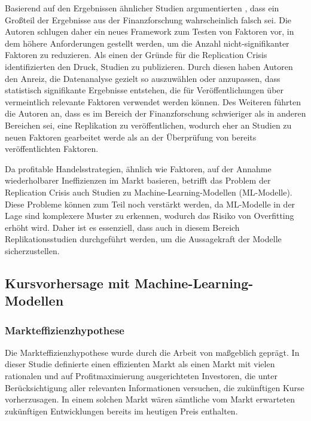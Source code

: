 \documentclass[a4paper, 12pt]{article}
\begin{document}
Basierend auf den Ergebnissen ähnlicher Studien argumentierten \textcite{Harvey2016}, dass ein Großteil der Ergebnisse aus der Finanzforschung wahrscheinlich falsch sei.
Die Autoren schlugen daher ein neues Framework zum Testen von Faktoren vor, in dem höhere Anforderungen gestellt werden, um die Anzahl nicht-signifikanter Faktoren zu reduzieren.
Als einen der Gründe für die Replication Crisis identifizierten \textcite{Harvey2016} den Druck, Studien zu publizieren.
Durch diesen haben Autoren den Anreiz, die Datenanalyse gezielt so auszuwählen oder anzupassen, dass statistisch signifikante Ergebnisse entstehen, die für Veröffentlichungen über vermeintlich relevante Faktoren verwendet werden können.
Des Weiteren führten die Autoren an, dass es im Bereich der Finanzforschung schwieriger als in anderen Bereichen sei, eine Replikation zu veröffentlichen, wodurch eher an Studien zu neuen Faktoren gearbeitet werde als an der Überprüfung von bereits veröffentlichten Faktoren.

Da profitable Handelsstrategien, ähnlich wie Faktoren, auf der Annahme wiederholbarer Ineffizienzen im Markt basieren, betrifft das Problem der Replication Crisis auch Studien zu Machine-Learning-Modellen (ML-Modelle).
Diese Probleme können zum Teil noch verstärkt werden, da ML-Modelle in der Lage sind komplexere Muster zu erkennen, wodurch das Risiko von Overfitting erhöht wird.
Daher ist es essenziell, dass auch in diesem Bereich Replikationsstudien durchgeführt werden, um die Aussagekraft der Modelle sicherzustellen.

\subsection{Kursvorhersage mit Machine-Learning-Modellen}

\subsubsection{Markteffizienzhypothese}
Die Markteffizienzhypothese wurde durch die Arbeit  von \textcite{Fama1965} maßgeblich geprägt.
In dieser Studie definierte \citeauthor{Fama1965} einen effizienten Markt als einen Markt mit vielen rationalen und auf Profitmaximierung ausgerichteten Investoren, die unter Berücksichtigung aller relevanten Informationen versuchen, die zukünftigen Kurse vorherzusagen.
In einem solchen Markt wären sämtliche vom Markt erwarteten zukünftigen Entwicklungen bereits im heutigen Preis enthalten.
\end{document}
